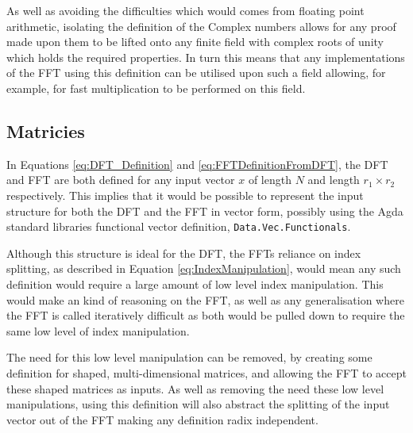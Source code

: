As well as avoiding the difficulties which would comes from floating point arithmetic,
isolating the definition of the Complex numbers allows for any proof made upon them
to be lifted onto any finite field with complex roots of unity which holds the
required properties.
In turn this means that any implementations of the FFT using
this definition can be utilised upon such a field allowing, for example, for fast
multiplication to be performed on this field.

\subsection{Matricies}
In Equations \ref{eq:DFT_Definition} and \ref{eq:FFTDefinitionFromDFT}, the DFT 
and FFT are both defined for any input vector $x$ of length $N$ and length 
$r_1\times r_2$ respectively. 
This implies that it would be possible to represent the input structure for both 
the DFT and the FFT in vector form, possibly using the Agda standard libraries functional
vector definition, \verb|Data.Vec.Functionals|.

Although this structure is ideal for the DFT, the FFTs reliance on index splitting,
as described in Equation \ref{eq:IndexManipulation}, would mean any such definition 
would require a large amount of low level index manipulation.
This would make an kind of reasoning on the FFT, as well as any generalisation 
where the FFT is called iteratively difficult as both would be
pulled down to require the same low level of index manipulation.

The need for this low level manipulation can be removed, by creating some
definition for shaped, multi-dimensional matrices, and allowing the FFT to 
accept these shaped matrices as inputs.
As well as removing the need these low level manipulations, using this definition 
will also abstract the splitting of the input vector out of the FFT making any    %
definition radix independent.

